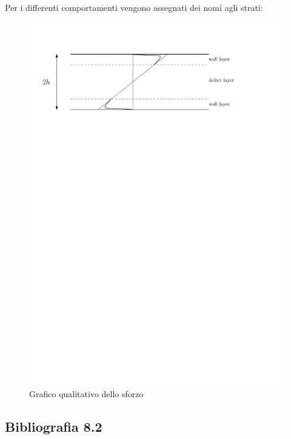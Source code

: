 Per i differenti comportamenti vengono assegnati dei nomi agli strati:
	\begin{figure}[ht]
		\includegraphics[scale=0.6]{./8.2 Equazioni del moto turbolento/8.2-3}
		\centering
		\caption{Grafico qualitativo dello sforzo}
	\end{figure}
%


\subsection*{Bibliografia 8.2}
\cite[Cap.\ 12.3]{PnueliGutfinger}